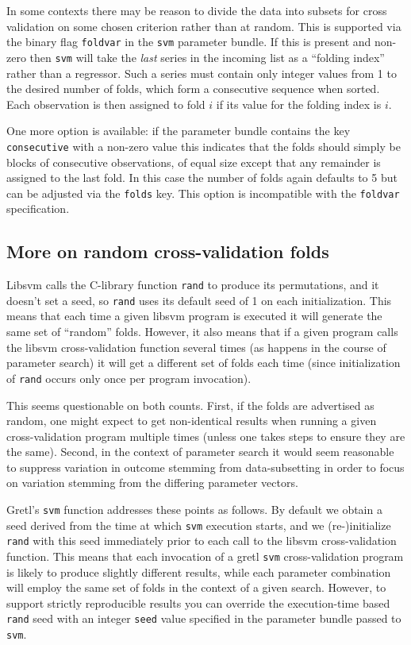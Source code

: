 \documentclass{article}
\begin{document}
In some contexts there may be reason to divide the data into subsets
for cross validation on some chosen criterion rather than at
random. This is supported via the binary flag \texttt{foldvar} in the
\texttt{svm} parameter bundle. If this is present and non-zero then
\texttt{svm} will take the \textit{last} series in the incoming list
as a ``folding index'' rather than a regressor. Such a series must
contain only integer values from 1 to the desired number of folds,
which form a consecutive sequence when sorted. Each observation is
then assigned to fold $i$ if its value for the folding index is $i$.

One more option is available: if the parameter bundle contains the key
\texttt{consecutive} with a non-zero value this indicates that the
folds should simply be blocks of consecutive observations, of equal
size except that any remainder is assigned to the last fold. In this
case the number of folds again defaults to 5 but can be adjusted via
the \texttt{folds} key. This option is incompatible with the
\texttt{foldvar} specification.

\subsection{More on random cross-validation folds}
\label{sec:random-folds}

\textsf{Libsvm} calls the C-library function \texttt{rand} to produce
its permutations, and it doesn't set a seed, so \texttt{rand} uses its
default seed of 1 on each initialization. This means that each time a
given \textsf{libsvm} program is executed it will generate the same
set of ``random'' folds. However, it also means that if a given
program calls the \textsf{libsvm} cross-validation function several
times (as happens in the course of parameter search) it will get a
different set of folds each time (since initialization of
\texttt{rand} occurs only once per program invocation).

This seems questionable on both counts. First, if the folds are
advertised as random, one might expect to get non-identical results
when running a given cross-validation program multiple times (unless
one takes steps to ensure they are the same). Second, in the context
of parameter search it would seem reasonable to suppress variation in
outcome stemming from data-subsetting in order to focus on variation
stemming from the differing parameter vectors.

Gretl's \texttt{svm} function addresses these points as follows. By
default we obtain a seed derived from the time at which \texttt{svm}
execution starts, and we (re-)initialize \texttt{rand} with this seed
immediately prior to each call to the \textsf{libsvm} cross-validation
function. This means that each invocation of a gretl \texttt{svm}
cross-validation program is likely to produce slightly different
results, while each parameter combination will employ the same set of
folds in the context of a given search. However, to support strictly
reproducible results you can override the execution-time based
\texttt{rand} seed with an integer \texttt{seed} value specified in
the parameter bundle passed to \texttt{svm}.
\end{document}
